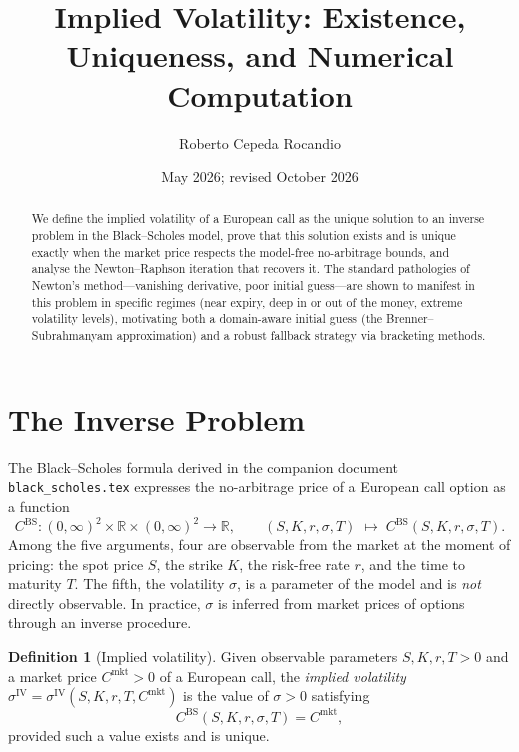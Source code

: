 \documentclass[11pt,a4paper]{article}
\title{Implied Volatility: Existence, Uniqueness, and Numerical Computation}
\author{Roberto Cepeda Rocandio}
\date{May 2026; revised October 2026}
\theoremstyle{plain}
\theoremstyle{definition}
\newtheorem{definition}[theorem]{Definition}
\theoremstyle{remark}
\newcommand{\R}{\mathbb{R}}
\newcommand{\BS}{\mathrm{BS}}
\newcommand{\IV}{\mathrm{IV}}
\begin{document}
\maketitle

\begin{abstract}
We define the implied volatility of a European call as the unique
solution to an inverse problem in the Black--Scholes model, prove that
this solution exists and is unique exactly when the market price
respects the model-free no-arbitrage bounds, and analyse the
Newton--Raphson iteration that recovers it. The standard pathologies
of Newton's method---vanishing derivative, poor initial guess---are
shown to manifest in this problem in specific regimes (near expiry,
deep in or out of the money, extreme volatility levels), motivating
both a domain-aware initial guess (the Brenner--Subrahmanyam
approximation) and a robust fallback strategy via bracketing methods.
\end{abstract}

\section{The Inverse Problem}

The Black--Scholes formula derived in the companion document
\texttt{black\_scholes.tex} expresses the no-arbitrage price of a
European call option as a function
\[
    C^{\BS}: (0, \infty)^2 \times \R \times (0, \infty)^2 \to \R,
    \qquad
    (S, K, r, \sigma, T) \;\longmapsto\; C^{\BS}(S, K, r, \sigma, T).
\]
Among the five arguments, four are observable from the market at the
moment of pricing: the spot price \(S\), the strike \(K\), the
risk-free rate \(r\), and the time to maturity \(T\). The fifth, the
volatility \(\sigma\), is a parameter of the model and is \emph{not}
directly observable. In practice, \(\sigma\) is inferred from market
prices of options through an inverse procedure.

\begin{definition}[Implied volatility]
\label{def:iv}
Given observable parameters \(S, K, r, T > 0\) and a market price
\(C^{\mathrm{mkt}} > 0\) of a European call, the \emph{implied
volatility} \(\sigma^{\IV} = \sigma^{\IV}(S, K, r, T, C^{\mathrm{mkt}})\)
is the value of \(\sigma > 0\) satisfying
\begin{equation}
    C^{\BS}(S, K, r, \sigma, T) = C^{\mathrm{mkt}},
    \label{eq:iv-equation}
\end{equation}
provided such a value exists and is unique.
\end{definition}
\end{document}
